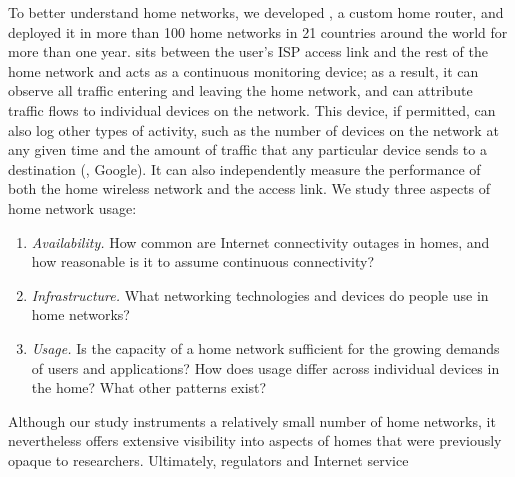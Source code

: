 To better understand home networks, we developed \name{}, a custom home router, and
deployed it in more than 100 home networks in 21 countries around the world for
more than one year.  \name{} sits between the user's ISP access link and the
rest of the home network and acts as a continuous monitoring device; as a
result, it can observe all traffic entering and leaving the home network, and
can attribute traffic flows to individual devices on the network.  This
device, if permitted, can also log other types of activity, such as the number of devices on
the network at any given time and the amount of traffic that any particular
device sends to a destination (\eg, Google).  It can also independently measure
the performance of both the home wireless network and the access link.
We study three aspects of home network usage:
\begin{enumerate}
\itemsep=-1pt
\item {\em Availability.} How common are Internet connectivity outages in homes,
    and how reasonable is it to assume continuous connectivity?
\item {\em Infrastructure.} What networking technologies and devices do people use
  in home networks?
\item {\em Usage.} Is the capacity of a home network sufficient for the
  growing demands of users and applications?  How does usage differ across
  individual devices in the home?  What other patterns exist?
\end{enumerate}
\noindent
\noindent
Although our study instruments a relatively small number of home networks,
it nevertheless offers extensive visibility into aspects of homes that were
previously opaque to researchers.  Ultimately, regulators and Internet service

